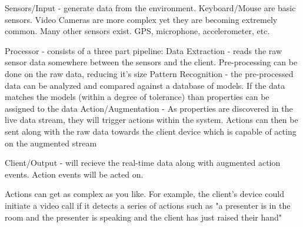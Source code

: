 \documentclass[final,a4paper,12pt]{report}
\begin{document}
Sensors/Input - generate data from the environment. Keyboard/Mouse are basic sensors. Video Cameras are more complex yet they are becoming extremely common. Many other sensors exist. GPS, microphone, accelerometer, etc.

Processor - consists of a three part pipeline:
	Data Extraction - reads the raw sensor data somewhere between the sensors and the client. Pre-processing can be done on the raw data, reducing it's size
	Pattern Recognition - the pre-processed data can be analyzed and compared against a database of models. If the data matches the models (within a degree of tolerance) than properties can be assigned to the data
	Action/Augmentation - As properties are discovered in the live data stream, they will trigger actions within the system. Actions can then be sent along with the raw data towards the client device which is capable of acting on the augmented stream

Client/Output - will recieve the real-time data along with augmented action events. Action events will be acted on.

Actions can get as complex as you like. For example, the client's device could initiate a video call if it detects a series of actions such as "a presenter is in the room and the presenter is speaking and the client has just raised their hand"




\end{document}
